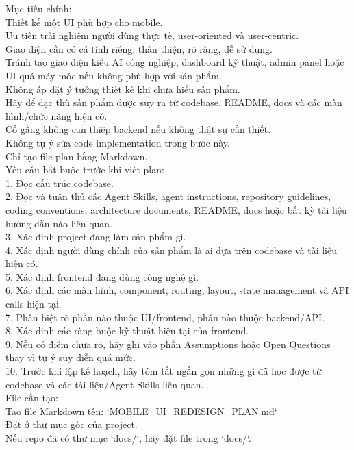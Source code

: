 \begin{enumerate}
Mục tiêu chính: \\
\* Thiết kế một UI phù hợp cho mobile. \\
\* Ưu tiên trải nghiệm người dùng thực tế, user-oriented và user-centric. \\
\* Giao diện cần có cá tính riêng, thân thiện, rõ ràng, dễ sử dụng. \\
\* Tránh tạo giao diện kiểu AI công nghiệp, dashboard kỹ thuật, admin panel hoặc UI quá máy móc nếu không phù hợp với sản phẩm. \\
\* Không áp đặt ý tưởng thiết kế khi chưa hiểu sản phẩm. \\
\* Hãy để đặc thù sản phẩm được suy ra từ codebase, README, docs và các màn hình/chức năng hiện có. \\
\* Cố gắng không can thiệp backend nếu không thật sự cần thiết. \\
\* Không tự ý sửa code implementation trong bước này. \\
\* Chỉ tạo file plan bằng Markdown. \\


Yêu cầu bắt buộc trước khi viết plan: \\

1. Đọc cấu trúc codebase. \\
2. Đọc và tuân thủ các Agent Skills, agent instructions, repository guidelines, coding conventions, architecture documents, README, docs hoặc bất kỳ tài liệu hướng dẫn nào liên quan. \\
3. Xác định project đang làm sản phẩm gì. \\
4. Xác định người dùng chính của sản phẩm là ai dựa trên codebase và tài liệu hiện có. \\
5. Xác định frontend đang dùng công nghệ gì. \\
6. Xác định các màn hình, component, routing, layout, state management và API calls hiện tại. \\
7. Phân biệt rõ phần nào thuộc UI/frontend, phần nào thuộc backend/API. \\
8. Xác định các ràng buộc kỹ thuật hiện tại của frontend. \\
9. Nếu có điểm chưa rõ, hãy ghi vào phần Assumptions hoặc Open Questions thay vì tự ý suy diễn quá mức. \\
10. Trước khi lập kế hoạch, hãy tóm tắt ngắn gọn những gì đã học được từ codebase và các tài liệu/Agent Skills liên quan. \\

File cần tạo: \\
\* Tạo file Markdown tên: `MOBILE\_UI\_REDESIGN\_PLAN.md` \\
\* Đặt ở thư mục gốc của project. \\
\* Nếu repo đã có thư mục `docs/`, hãy đặt file trong `docs/`. \\



\end{enumerate}
